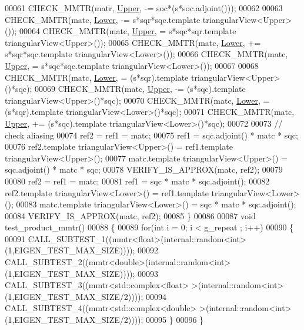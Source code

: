 \begin{DoxyCode}
00061   CHECK\_MMTR(matr, \hyperlink{group__enums_gga39e3366ff5554d731e7dc8bb642f83cda6bcb58be3b8b8ec84859ce0c5ac0aaec}{Upper}, -= soc*(s*soc.adjoint()));
00062   
00063   CHECK\_MMTR(matc, \hyperlink{group__enums_gga39e3366ff5554d731e7dc8bb642f83cda891792b8ed394f7607ab16dd716f60e6}{Lower}, -= s*sqr*sqc.template triangularView<Upper>());
00064   CHECK\_MMTR(matc, \hyperlink{group__enums_gga39e3366ff5554d731e7dc8bb642f83cda6bcb58be3b8b8ec84859ce0c5ac0aaec}{Upper}, = s*sqc*sqr.template triangularView<Upper>());
00065   CHECK\_MMTR(matc, \hyperlink{group__enums_gga39e3366ff5554d731e7dc8bb642f83cda891792b8ed394f7607ab16dd716f60e6}{Lower}, += s*sqr*sqc.template triangularView<Lower>());
00066   CHECK\_MMTR(matc, \hyperlink{group__enums_gga39e3366ff5554d731e7dc8bb642f83cda6bcb58be3b8b8ec84859ce0c5ac0aaec}{Upper}, = s*sqc*sqc.template triangularView<Lower>());
00067   
00068   CHECK\_MMTR(matc, \hyperlink{group__enums_gga39e3366ff5554d731e7dc8bb642f83cda891792b8ed394f7607ab16dd716f60e6}{Lower}, = (s*sqr).\textcolor{keyword}{template} triangularView<Upper>()*sqc);
00069   CHECK\_MMTR(matc, \hyperlink{group__enums_gga39e3366ff5554d731e7dc8bb642f83cda6bcb58be3b8b8ec84859ce0c5ac0aaec}{Upper}, -= (s*sqc).\textcolor{keyword}{template} triangularView<Upper>()*sqc);
00070   CHECK\_MMTR(matc, \hyperlink{group__enums_gga39e3366ff5554d731e7dc8bb642f83cda891792b8ed394f7607ab16dd716f60e6}{Lower}, = (s*sqr).\textcolor{keyword}{template} triangularView<Lower>()*sqc);
00071   CHECK\_MMTR(matc, \hyperlink{group__enums_gga39e3366ff5554d731e7dc8bb642f83cda6bcb58be3b8b8ec84859ce0c5ac0aaec}{Upper}, += (s*sqc).\textcolor{keyword}{template} triangularView<Lower>()*sqc);
00072 
00073   \textcolor{comment}{// check aliasing}
00074   ref2 = ref1 = matc;
00075   ref1 = sqc.adjoint() * matc * sqc;
00076   ref2.template triangularView<Upper>() = ref1.template triangularView<Upper>();
00077   matc.template triangularView<Upper>() = sqc.adjoint() * matc * sqc;
00078   VERIFY\_IS\_APPROX(matc, ref2);
00079 
00080   ref2 = ref1 = matc;
00081   ref1 = sqc * matc * sqc.adjoint();
00082   ref2.template triangularView<Lower>() = ref1.template triangularView<Lower>();
00083   matc.template triangularView<Lower>() = sqc * matc * sqc.adjoint();
00084   VERIFY\_IS\_APPROX(matc, ref2);
00085 \}
00086 
00087 \textcolor{keywordtype}{void} test\_product\_mmtr()
00088 \{
00089   \textcolor{keywordflow}{for}(\textcolor{keywordtype}{int} i = 0; i < g\_repeat ; i++)
00090   \{
00091     CALL\_SUBTEST\_1((mmtr<float>(internal::random<int>(1,EIGEN\_TEST\_MAX\_SIZE))));
00092     CALL\_SUBTEST\_2((mmtr<double>(internal::random<int>(1,EIGEN\_TEST\_MAX\_SIZE))));
00093     CALL\_SUBTEST\_3((mmtr<std::complex<float> >(internal::random<int>(1,EIGEN\_TEST\_MAX\_SIZE/2))));
00094     CALL\_SUBTEST\_4((mmtr<std::complex<double> >(internal::random<int>(1,EIGEN\_TEST\_MAX\_SIZE/2))));
00095   \}
00096 \}
\end{DoxyCode}
